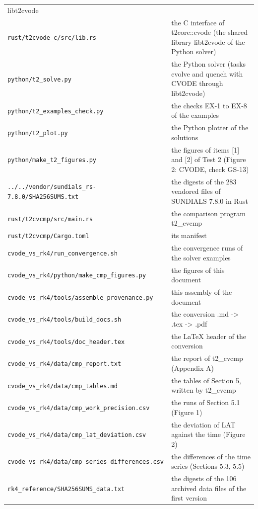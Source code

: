 \documentclass[
  10pt,
]{article}
\begin{document}
\begin{longtable}[]{@{}
  >{\raggedright\arraybackslash}p{}
  >{\raggedright\arraybackslash}p{}@{}}
libt2cvode \\
\texttt{rust/t2cvode\_c/src/lib.rs} & the C interface of t2core::cvode
(the shared library libt2cvode of the Python solver) \\
\texttt{python/t2\_solve.py} & the Python solver (tasks evolve and
quench with CVODE through libt2cvode) \\
\texttt{python/t2\_examples\_check.py} & the checks EX-1 to EX-8 of the
examples \\
\texttt{python/t2\_plot.py} & the Python plotter of the solutions \\
\texttt{python/make\_t2\_figures.py} & the figures of items {[}1{]} and
{[}2{]} of Test 2 (Figure 2: CVODE, check GS-13) \\
\texttt{../../vendor/sundials\_rs-7.8.0/SHA256SUMS.txt} & the digests of
the 283 vendored files of SUNDIALS 7.8.0 in Rust \\
\texttt{rust/t2cvcmp/src/main.rs} & the comparison program t2\_cvcmp \\
\texttt{rust/t2cvcmp/Cargo.toml} & its manifest \\
\texttt{cvode\_vs\_rk4/run\_convergence.sh} & the convergence runs of
the solver examples \\
\texttt{cvode\_vs\_rk4/python/make\_cmp\_figures.py} & the figures of
this document \\
\texttt{cvode\_vs\_rk4/tools/assemble\_provenance.py} & this assembly of
the document \\
\texttt{cvode\_vs\_rk4/tools/build\_docs.sh} & the conversion .md
-\textgreater{} .tex -\textgreater{} .pdf \\
\texttt{cvode\_vs\_rk4/tools/doc\_header.tex} & the LaTeX header of the
conversion \\
\texttt{cvode\_vs\_rk4/data/cmp\_report.txt} & the report of t2\_cvcmp
(Appendix A) \\
\texttt{cvode\_vs\_rk4/data/cmp\_tables.md} & the tables of Section 5,
written by t2\_cvcmp \\
\texttt{cvode\_vs\_rk4/data/cmp\_work\_precision.csv} & the runs of
Section 5.1 (Figure 1) \\
\texttt{cvode\_vs\_rk4/data/cmp\_lat\_deviation.csv} & the deviation of
LAT against the time (Figure 2) \\
\texttt{cvode\_vs\_rk4/data/cmp\_series\_differences.csv} & the
differences of the time series (Sections 5.3, 5.5) \\
\texttt{rk4\_reference/SHA256SUMS\_data.txt} & the digests of the 106
archived data files of the first version \\

\end{longtable}
\end{document}
